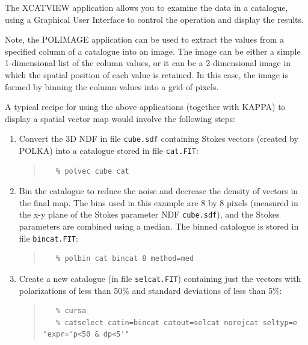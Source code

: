 \documentclass[twoside,11pt]{article}
\newcommand{\htmlref}[2]{#1}
\newcommand{\xref}[3]{#1}
\renewcommand{\_}{\texttt{\symbol{95}}}
\newenvironment{myquote}{\begin{quote}\begin{small}}{\end{small}\end{quote}}
\begin{document}
The \xref{XCATVIEW}{sun190}{XVIEW} application allows you to examine the
data in a catalogue, using a Graphical User Interface to control the
operation and display the results.

Note, the \htmlref{POLIMAGE}{POLIMAGE} application can be used to extract
the values from a specified column of a catalogue into an image. The image 
can be either a simple 1-dimensional list of the column values, or it can
be a 2-dimensional image in which the spatial position of each value is
retained. In this case, the image is formed by binning the column values
into a grid of pixels.

A typical recipe for using the above applications (together with KAPPA)
to display a spatial vector map would involve the following steps:

\begin{enumerate}

\item Convert the 3D NDF in file \verb+cube.sdf+ containing Stokes vectors
(created by POLKA) into a catalogue stored in file \verb+cat.FIT+:

\begin{myquote}
\begin{verbatim}
   % polvec cube cat
\end{verbatim}
\end{myquote}

\item Bin the catalogue to reduce the noise and decrease the density
of vectors in the final map. The bins used in this example are 8 by 
8 pixels (measured in
the x-y plane of the Stokes parameter NDF \verb+cube.sdf+), and the
Stokes parameters are combined using a median. The binned catalogue is
stored in file \verb+bincat.FIT+:

\begin{myquote}
\begin{verbatim}
   % polbin cat bincat 8 method=med
\end{verbatim}
\end{myquote}

\item Create a new catalogue (in file \verb+selcat.FIT+) containing just
the vectors with polarizations of less than 50\% and standard deviations of
less than 5\%:

\begin{myquote}
\begin{verbatim}
   % cursa
   % catselect catin=bincat catout=selcat norejcat seltyp=e "expr='p<50 & dp<5'"
\end{verbatim}
\end{myquote}


\end{enumerate}
\end{document}
